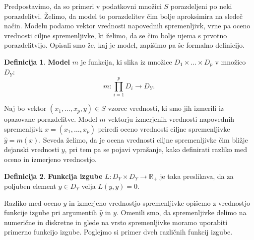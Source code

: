 \documentclass[12pt,a4paper,twoside]{article}
\theoremstyle{definition} %
\newtheorem{definicija}{Definicija}[section]
\theoremstyle{plain} %
\numberwithin{equation}{section}  %
\begin{document}
Predpostavimo, da so primeri v podatkovni množici $S$ porazdeljeni po neki porazdelitvi. Želimo, da model to porazdelitev čim bolje aproksimira na sledeč način. Modelu podamo vektor vrednosti napovednih spremenljivk, vrne pa oceno vrednosti ciljne spremenljivke, ki želimo, da se čim bolje ujema s prvotno porazdelitvijo. Opisali smo že, kaj je model, zapišimo pa še formalno definicijo.

\begin{definicija}
\textbf{Model} $m$ je funkcija, ki slika iz množice $D_1 \times \ldots \times D_p$ v množico $D_Y$:
$$
m: \prod_{i=1}^p D_i \rightarrow D_Y.
$$
\end{definicija}

Naj bo vektor $(x_1, \ldots, x_p, y) \in S$ vzorec vrednosti, ki smo jih izmerili iz opazovane porazdelitve. Model $m$ vektorju izmerjenih vrednosti napovednih spremenljivk $x=(x_1, \ldots, x_p)$ priredi oceno vrednosti ciljne spremenljivke $\hat{y}=m(x)$. Seveda želimo, da je ocena vrednosti ciljne spremenljivke čim bližje dejanski vrednosti $y$, pri tem pa se pojavi vprašanje, kako definirati razliko med oceno in izmerjeno vrednostjo.

\begin{definicija}
\textbf{Funkcija izgube} $L: D_Y \times D_Y \rightarrow \mathbb{R}_+$ je taka preslikava, da za poljuben element $y \in D_Y$ velja $L(y,y) = 0$.
\end{definicija}

Razliko med oceno $\hat{y}$ in izmerjeno vrednostjo spremenljivke opišemo z vrednostjo funkcije izgube pri argumentih $\hat{y}$ in $y$. Omenili smo, da spremenljivke delimo na numerične in diskretne in glede na vrsto spremenljivke moramo uporabiti primerno funkcijo izgube. Poglejmo si primer dveh različnih funkcij izgube.
\end{document}

